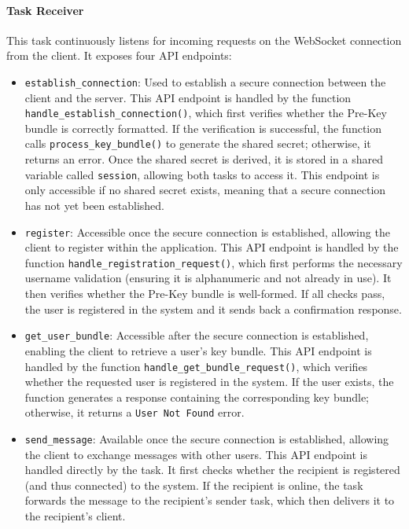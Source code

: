 \paragraph{Task Receiver}  
\sloppy  
This task continuously listens for incoming requests on the WebSocket connection from the client. It exposes four API endpoints:  

\begin{itemize}  
    
  \item \texttt{establish\_connection}: Used to establish a secure connection between the client and the server. This API endpoint is handled by the function \\ \texttt{handle\_establish\_connection()}, which first verifies whether the Pre-Key bundle is correctly formatted. If the verification is successful, the function calls \texttt{process\_key\_bundle()} to generate the shared secret; otherwise, it returns an error. Once the shared secret is derived, it is stored in a shared variable called \texttt{session}, allowing both tasks to access it.  
    This endpoint is only accessible if no shared secret exists, meaning that a secure connection has not yet been established.  

    \item \texttt{register}:  
    Accessible once the secure connection is established, allowing the client to register within the application. This API endpoint is handled by the function \texttt{handle\_registration\_request()}, which first performs the necessary username validation (ensuring it is alphanumeric and not already in use). It then verifies whether the Pre-Key bundle is well-formed. If all checks pass, the user is registered in the system and it sends back a confirmation response.  

    \item \texttt{get\_user\_bundle}:  
    Accessible after the secure connection is established, enabling the client to retrieve a user's key bundle. This API endpoint is handled by the function \texttt{handle\_get\_bundle\_request()}, which verifies whether the requested user is registered in the system. If the user exists, the function generates a response containing the corresponding key bundle; otherwise, it returns a \texttt{User Not Found} error.  

    \item \texttt{send\_message}:  
    Available once the secure connection is established, allowing the client to exchange messages with other users. This API endpoint is handled directly by the task. It first checks whether the recipient is registered (and thus connected) to the system. If the recipient is online, the task forwards the message to the recipient's sender task, which then delivers it to the recipient's client.  
\end{itemize}  

